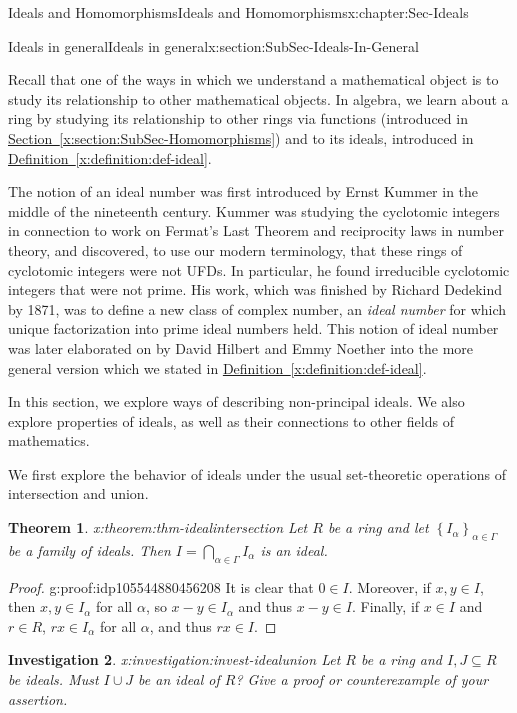 \documentclass[oneside,10pt,]{book}
\newcommand{\xreffont}{\relax}
\numberwithin{equation}{section}
\newcommand{\set}[1]{\left\{ {#1} \right\}}
\newtheorem{theorem}{Theorem}[section]
\newtheorem{investigation}[theorem]{Investigation}
\begin{document}
\begin{chapterptx}{Ideals and Homomorphisms}{}{Ideals and Homomorphisms}{}{}{x:chapter:Sec-Ideals}
\begin{sectionptx}{Ideals in general}{}{Ideals in general}{}{}{x:section:SubSec-Ideals-In-General}
\begin{introduction}{}
Recall that one of the ways in which we understand a mathematical object is to study its relationship to other mathematical objects. In algebra, we learn about a ring by studying its relationship to other rings via functions (introduced in \hyperref[x:section:SubSec-Homomorphisms]{Section~{\xreffont\ref{x:section:SubSec-Homomorphisms}}}) and to its ideals, introduced in \hyperref[x:definition:def-ideal]{Definition~{\xreffont\ref{x:definition:def-ideal}}}.%
\par
The notion of an ideal number was first introduced by Ernst Kummer in the middle of the nineteenth century. Kummer was studying the cyclotomic integers in connection to work on Fermat's Last Theorem and reciprocity laws in number theory, and discovered, to use our modern terminology, that these rings of cyclotomic integers were not UFDs. In particular, he found irreducible cyclotomic integers that were not prime. His work, which was finished by Richard Dedekind by 1871, was to define a new class of complex number, an \emph{ideal number} for which unique factorization into prime ideal numbers held. This notion of ideal number was later elaborated on by David Hilbert and Emmy Noether into the more general version which we stated in \hyperref[x:definition:def-ideal]{Definition~{\xreffont\ref{x:definition:def-ideal}}}.%
\par
In this section, we explore ways of describing non-principal ideals. We also explore properties of ideals, as well as their connections to other fields of mathematics.%
\end{introduction}%
We first explore the behavior of ideals under the usual set-theoretic operations of intersection and union.%
\begin{theorem}{}{}{x:theorem:thm-idealintersection}%
Let \(R\) be a ring and let \(\set{I_{\alpha}}_{\alpha\in \Gamma}\) be a family of ideals. Then \(I = \bigcap\limits_{\alpha\in \Gamma} I_\alpha\) is an ideal.%
\end{theorem}
\begin{proof}{}{g:proof:idp105544880456208}
It is clear that \(0\in I\). Moreover, if \(x,y\in I\), then \(x,y\in I_\alpha\) for all \(\alpha\), so \(x-y\in I_\alpha\) and thus \(x-y\in I\). Finally, if \(x\in I\) and \(r\in R\), \(rx\in I_\alpha\) for all \(\alpha\), and thus \(rx\in I\).%
\end{proof}
\begin{investigation}{}{x:investigation:invest-idealunion}%
Let \(R\) be a ring and \(I,J\subseteq R\) be ideals. Must \(I\cup J\) be an ideal of \(R\)? Give a proof or counterexample of your assertion.%

\end{investigation}
\end{sectionptx}
\end{chapterptx}
\end{document}

